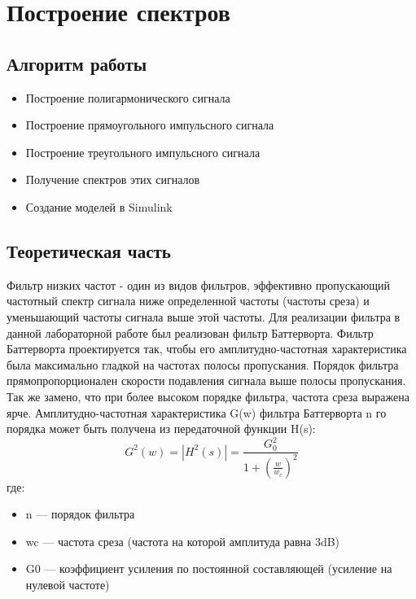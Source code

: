 \documentclass[10pt,a4paper]{report}
\begin{document}
\chapter{Построение спектров}
\section{Алгоритм работы}
\begin{itemize}
\item Построение полигармонического сигнала
\item Построение прямоугольного импульсного сигнала
\item Построение треугольного импульсного сигнала
\item Получение спектров этих сигналов
\item Создание моделей в Simulink
\end{itemize}
\section  {Теоретическая часть}
Фильтр низких частот - один из видов фильтров, эффективно пропускающий частотный спектр сигнала ниже определенной частоты (частоты среза) и уменьшающий частоты сигнала выше этой частоты. Для реализации фильтра в данной лабораторной работе был реализован фильтр Баттерворта. Фильтр Баттерворта проектируется так, чтобы его амплитудно-частотная характеристика была максимально гладкой на частотах полосы пропускания. Порядок фильтра прямопропорционален скорости подавления сигнала выше полосы пропускания. Так же замено, что при более высоком порядке фильтра, частота среза выражена ярче. Амплитудно-частотная характеристика G(w) фильтра Баттерворта n го порядка может быть получена из передаточной функции H(s):
\begin{displaymath}
	G^2(w) = |H^2(s)| = \frac{G_0^2}{1+(\frac{w}{w_c})^2}
\end{displaymath}
где:
\begin{itemize}
\item n — порядок фильтра
\item wc — частота среза (частота на которой амплитуда равна 3dB)
\item G0 — коэффициент усиления по постоянной составляющей (усиление на нулевой частоте)
\end{itemize}
\end{document}
